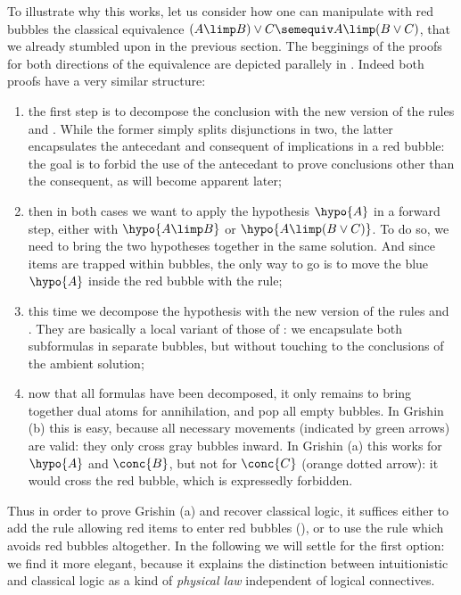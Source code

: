 To illustrate why this works, let us consider how one can manipulate with red
bubbles the classical equivalence $ (A \limp B) \lor C \semequiv A \limp (B \lor
C)$, that we already stumbled upon in the previous section. The begginings of
the proofs for both directions of the equivalence are depicted parallely in
. Indeed both proofs have a very similar structure:
\begin{enumerate}
  \item the first step is to decompose the conclusion with the new version of
  the rules {\rnm{{\lor}{+}}} and {\rnm{{\limp}{+}}}. While the former simply
  splits disjunctions in two, the latter encapsulates the antecedant and
  consequent of implications in a red bubble: the goal is to forbid the use of
  the antecedant to prove conclusions other than the consequent, as will become
  apparent later;
  \item then in both cases we want to apply the hypothesis $\hypo{A}$ in a
  forward step, either with $\hypo{A \limp B}$ or $\hypo{A \limp (B \lor C)}$.
  To do so, we need to bring the two hypotheses together in the same solution.
  And since items are trapped within bubbles, the only way to go is to move the
  blue $\hypo{A}$ inside the red bubble with the {} rule;
  \item this time we decompose the hypothesis with the new version of the rules
  {\rnm{{\lor}{-}}} and {\rnm{{\limp}{-}}}. They are basically a local variant
  of those of : we encapsulate both subformulas in separate bubbles, but
  without touching to the conclusions of the ambient solution;
  \item now that all formulas have been decomposed, it only remains to bring
  together dual atoms for annihilation, and pop all empty bubbles. In Grishin
  (b) this is easy, because all necessary movements (indicated by green arrows)
  are valid: they only cross gray bubbles inward. In Grishin (a) this works for
  $\hypo{A}$ and $\conc{B}$, but not for $\conc{C}$ (orange dotted arrow): it
  would cross the red bubble, which is expressedly forbidden.
\end{enumerate}
Thus in order to prove Grishin (a) and recover classical logic, it suffices
either to add the {} rule allowing red items to enter red bubbles
(), or to use the {} rule which
avoids red bubbles altogether. In the following we will settle for the first
option: we find it more elegant, because it explains the distinction between
intuitionistic and classical logic as a kind of \emph{physical law} independent
of logical connectives.

